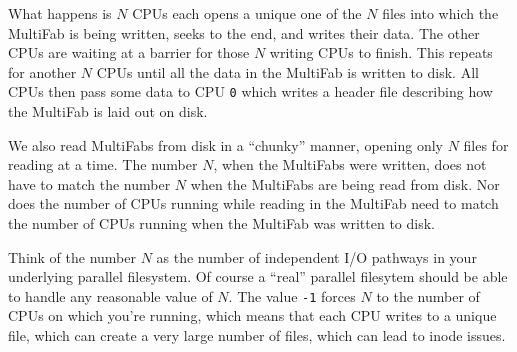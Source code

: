 What happens is $N$ CPUs each opens a unique one of the $N$ files into
which the MultiFab is being written, seeks to the end, and writes
their data.  The other CPUs are waiting at a barrier for those $N$
writing CPUs to finish.  This repeats for another $N$ CPUs until all the
data in the MultiFab is written to disk.  All CPUs then pass some data
to CPU {\tt 0} which writes a header file describing how the MultiFab is
laid out on disk.

We also read MultiFabs from disk in a ``chunky'' manner, opening only $N$
files for reading at a time.  The number $N$, when the MultiFabs were
written, does not have to match the number $N$ when the MultiFabs are
being read from disk.  Nor does the number of CPUs running while
reading in the MultiFab need to match the number of CPUs running when
the MultiFab was written to disk.

Think of the number $N$ as the number of independent I/O pathways in
your underlying parallel filesystem.  Of course a ``real'' parallel
filesytem should be able to handle any reasonable value of $N$.  The
value {\tt -1} forces $N$ to the number of CPUs on which you're
running, which means that each CPU writes to a unique file, which can
create a very large number of files, which can lead to inode issues.
